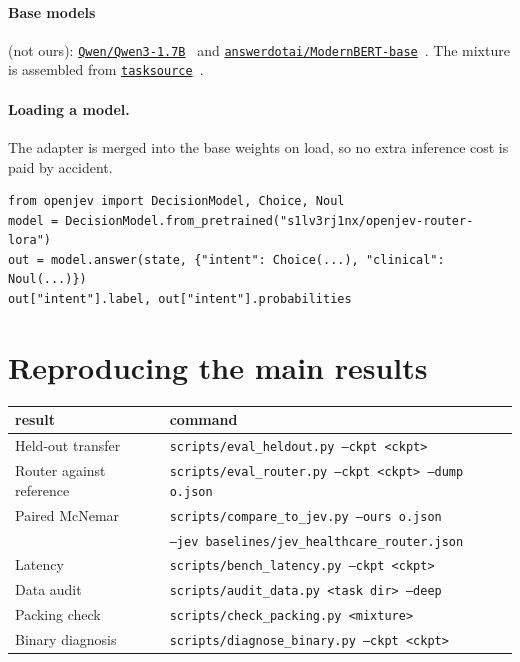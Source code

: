 \paragraph{Base models} (not ours):
\href{https://huggingface.co/Qwen/Qwen3-1.7B}{\texttt{Qwen/Qwen3-1.7B}}~\cite{qwen3}
and
\href{https://huggingface.co/answerdotai/ModernBERT-base}{\texttt{answerdotai/ModernBERT-base}}~\cite{modernbert}.
The mixture is assembled from
\href{https://huggingface.co/tasksource}{\texttt{tasksource}}~\cite{tasksource}.

\paragraph{Loading a model.} The adapter is merged into the base weights
on load, so no extra inference cost is paid by accident.

\begin{verbatim}
from openjev import DecisionModel, Choice, Noul
model = DecisionModel.from_pretrained("s1lv3rj1nx/openjev-router-lora")
out = model.answer(state, {"intent": Choice(...), "clinical": Noul(...)})
out["intent"].label, out["intent"].probabilities
\end{verbatim}

\section{Reproducing the main results}
\label{app:repro}

\begin{center}
\small
\begin{tabular}{ll}
\toprule
result & command \\
\midrule
Held-out transfer & \texttt{scripts/eval\_heldout.py --ckpt <ckpt>} \\
Router against reference & \texttt{scripts/eval\_router.py --ckpt <ckpt> --dump o.json} \\
Paired McNemar & \texttt{scripts/compare\_to\_jev.py --ours o.json} \\
 & \quad \texttt{--jev baselines/jev\_healthcare\_router.json} \\
Latency & \texttt{scripts/bench\_latency.py --ckpt <ckpt>} \\
Data audit & \texttt{scripts/audit\_data.py <task dir> --deep} \\
Packing check & \texttt{scripts/check\_packing.py <mixture>} \\
Binary diagnosis & \texttt{scripts/diagnose\_binary.py --ckpt <ckpt>} \\
\bottomrule
\end{tabular}
\end{center}

